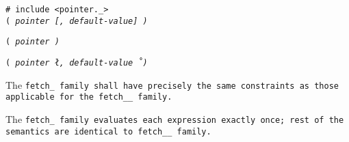 
\tt{# include <pointer._>}\\

\s\s\s\tt{(} \it{pointer} [\tt{,} \it{default-value}]  \tt{)}

\s\tt{(} \it{pointer} \tt{)}

\s\tt{(} \it{pointer} \l\tt{,} \it{default-value}\r\ \tt{)}


The \tt{fetch_} family shall have precisely the same
constraints as those applicable for the \tt{fetch__} family.


The \tt{fetch_} family evaluates each expression exactly once;
rest of the semantics are identical to  \tt{fetch__} family.
